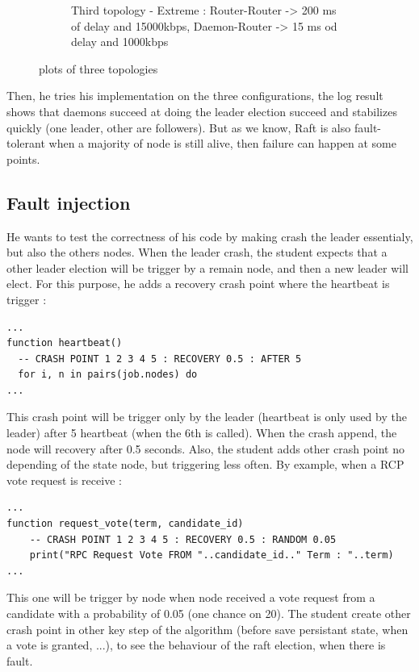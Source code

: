 \documentclass{eplmastersthesis}
\begin{document}
\begin{figure}[H]
\begin{subfigure}{.33\textwidth}
              \caption{Third topology - Extreme : Router-Router -> 200 ms of delay and 15000kbps, Daemon-Router -> 15 ms od delay and 1000kbps}
              \label{fig:topo3}
            \end{subfigure}
            \caption{plots of three topologies}
            \label{fig:topologies}
          \end{figure}

          Then, he tries his implementation on the three configurations, the log result shows that
          daemons succeed at doing the leader election succeed and stabilizes quickly
          (one leader, other are followers). But as we know, Raft is also fault-tolerant when a majority of node is
          still alive, then failure can happen at some points. \\

        \subsection{Fault injection} %

          He wants to test the correctness of his code by making crash the leader essentialy, but also the others nodes.
          When the leader crash, the student expects that a other leader election will be trigger by a remain node,
          and then a new leader will elect. For this purpose, he adds a recovery crash point where the heartbeat is trigger :

          \begin{lstlisting}[style=MyLua]
...
function heartbeat()
  -- CRASH POINT 1 2 3 4 5 : RECOVERY 0.5 : AFTER 5
  for i, n in pairs(job.nodes) do
...
          \end{lstlisting}

          This crash point will be trigger only by the leader (heartbeat is only used by the leader) after 5 heartbeat (when the 6th is called).
          When the crash append, the node will recovery after 0.5 seconds.
          Also, the student adds other crash point no depending of the state node, but triggering
          less often. By example, when a RCP vote request is receive :
          \begin{lstlisting}[style=MyLua]
...
function request_vote(term, candidate_id)
    -- CRASH POINT 1 2 3 4 5 : RECOVERY 0.5 : RANDOM 0.05
    print("RPC Request Vote FROM "..candidate_id.." Term : "..term)
...
          \end{lstlisting}
          This one will be trigger by node when node received a vote request from a candidate with a probability of 0.05 (one chance on 20).
          The student create other crash point in other key step of the algorithm (before save persistant state, when a vote is granted, ...),
          to see the behaviour of the raft election, when there is fault. \\
\end{document}
